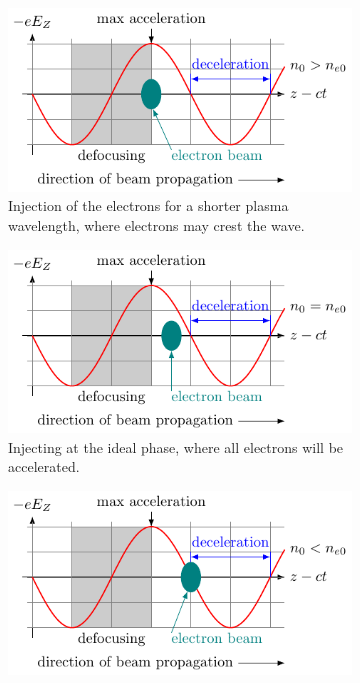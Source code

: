 \begin{figure}[!tb]
	\centering
	\begin{subfigure}{\linewidth}
		\centering
		\includegraphics[width=\textwidth]{figures/phases-a.pdf}
		\caption{Injection of the electrons for a shorter plasma wavelength,
		where electrons may crest the wave.}
		\label{fig:phase-a}
	\end{subfigure}
	\begin{subfigure}{\linewidth}
		\centering
		\includegraphics[width=\textwidth]{figures/phases-b.pdf}
		\caption{Injecting at the ideal phase, where all electrons will be
		accelerated.}
		\label{fig:phase-b}
	\end{subfigure}
	\begin{subfigure}{\linewidth}
		\centering
		\includegraphics[width=\textwidth]{figures/phases-c.pdf}

\end{subfigure}
\end{figure}
